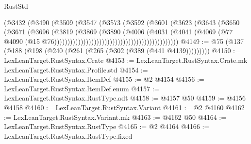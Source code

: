 \begin{lexlean}{RustStd}
\begin{coremodule}
                                                        (@3432
                                                          (@3490
                                                            (@3509
                                                              (@3547
                                                                (@3573
                                                                  (@3592
                                                                    (@3601
                                                                      (@3623
                                                                        (@3643
                                                                          (@3650
                                                                            (@3671
                                                                              (@3696
                                                                                (@3819
                                                                                  (@3869
                                                                                    (@3890
                                                                                      (@4006
                                                                                        (@4031
                                                                                          (@4041
                                                                                            (@4069
                                                                                              (@77
                                                                                                @4090
                                                                                                (@15
                                                                                                  @76)))))))))))))))))))))))))))))))))))))))))))))))
@4149 := @75 (@137 (@188 (@198 (@240 (@261 (@265 (@302 (@389 (@441 @4139)))))))))
@4150 := LexLeanTarget.RustSyntax.Crate
@4153 := LexLeanTarget.RustSyntax.Crate.mk LexLeanTarget.RustSyntax.Profile.std
@4154 := LexLeanTarget.RustSyntax.ItemDef
@4155 := @2 @4154
@4156 := LexLeanTarget.RustSyntax.ItemDef.enum
@4157 := LexLeanTarget.RustSyntax.RustType.adt
@4158 := @4157 @50
@4159 := @4156 @4158
@4160 := LexLeanTarget.RustSyntax.Variant
@4161 := @2 @4160
@4162 := LexLeanTarget.RustSyntax.Variant.mk
@4163 := @4162 @50
@4164 := LexLeanTarget.RustSyntax.RustType
@4165 := @2 @4164
@4166 := LexLeanTarget.RustSyntax.RustType.fixed

\end{coremodule}
\end{lexlean}
